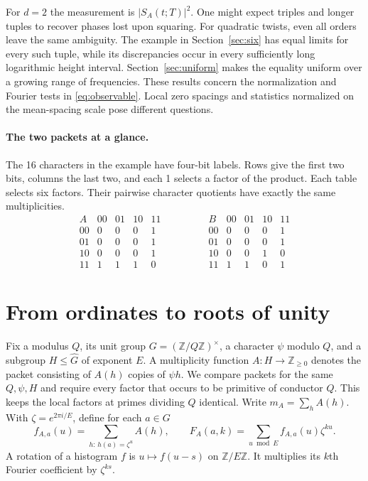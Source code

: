 \documentclass[11pt,letterpaper]{article}
\newcommand{\Z}{\mathbb Z}
\begin{document}
For $d=2$ the measurement is $|S_A(t;T)|^2$. One might expect triples and longer tuples to recover phases lost upon squaring. For quadratic twists, even all orders leave the same ambiguity. The example in Section~\ref{sec:six} has equal limits for every such tuple, while its discrepancies occur in every sufficiently long logarithmic height interval. Section~\ref{sec:uniform} makes the equality uniform over a growing range of frequencies. These results concern the normalization and Fourier tests in \eqref{eq:observable}. Local zero spacings and statistics normalized on the mean-spacing scale pose different questions.

\paragraph{The two packets at a glance.}
The 16 characters in the example have four-bit labels. Rows give the first two bits, columns the last two, and each 1 selects a factor of the product. Each table selects six factors. Their pairwise character quotients have exactly the same multiplicities.
\[
\begin{array}{c|cccc}
 A &00&01&10&11\\\hline
 00&0&0&0&1\\01&0&0&0&1\\10&0&0&0&1\\11&1&1&1&0
\end{array}
\qquad\qquad
\begin{array}{c|cccc}
 B &00&01&10&11\\\hline
 00&0&0&0&1\\01&0&0&0&1\\10&0&0&1&0\\11&1&1&0&1
\end{array}
\]

\newpage
\section{From ordinates to roots of unity}\label{sec:prime}
Fix a modulus $Q$, its unit group $G=(\Z/Q\Z)^\times$, a character $\psi$ modulo $Q$, and a subgroup $H\le\widehat G$ of exponent $E$. A multiplicity function $A:H\to\Z_{\ge0}$ denotes the packet consisting of $A(h)$ copies of $\psi h$. We compare packets for the same $Q,\psi,H$ and require every factor that occurs to be primitive of conductor $Q$. This keeps the local factors at primes dividing $Q$ identical. Write $m_A=\sum_h A(h)$. With $\zeta=e^{2\pi i/E}$, define for each $a\in G$
\[
 f_{A,a}(u)=\sum_{h:\,h(a)=\zeta^u} A(h),\qquad
 F_A(a,k)=\sum_{u\bmod E} f_{A,a}(u)\zeta^{ku}.
\]
A rotation of a histogram $f$ is $u\mapsto f(u-s)$ on $\Z/E\Z$. It multiplies its $k$th Fourier coefficient by $\zeta^{ks}$.
\end{document}
